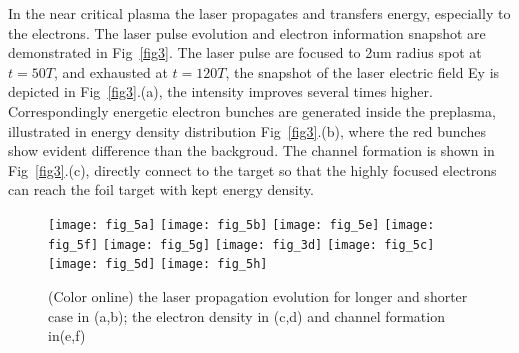 \documentclass[aip,twocolumn,superscriptaddress,showpacs,amsmath]{revtex4}
\begin{document}
In the near critical plasma the laser propagates and transfers energy, especially 
to the electrons.
The laser pulse evolution and electron information snapshot are demonstrated
in Fig~\ref{fig3}. The laser pulse are focused to 2um radius spot at $t=50T$,
and exhausted at $t=120T$, the snapshot of the laser electric field Ey is
depicted in Fig~\ref{fig3}.(a), the intensity improves several times higher.
Correspondingly energetic electron bunches are generated inside the preplasma, 
illustrated in energy density distribution Fig~\ref{fig3}.(b), where the 
red bunches show evident difference than the backgroud.
The channel formation is shown in Fig~\ref{fig3}.(c), directly connect to the target so that
the highly focused electrons can reach the foil target with kept energy density.





\begin{figure}[htbp]
\texttt{[image: fig\_5a]}
\vspace{2.00mm}
\texttt{[image: fig\_5b]}
\vspace{2.00mm}
\texttt{[image: fig\_5e]}
\vspace{2.00mm}
\texttt{[image: fig\_5f]}
\texttt{[image: fig\_5g]}
\texttt{[image: fig\_3d]}
\texttt{[image: fig\_5c]}
\vspace{2.00mm}
\texttt{[image: fig\_5d]}
\texttt{[image: fig\_5h]}
\caption{\label{fig4}(Color online) the laser propagation evolution for longer
and shorter case in (a,b); the electron density in (c,d) and channel formation
in(e,f)}
\end{figure}
\end{document}
